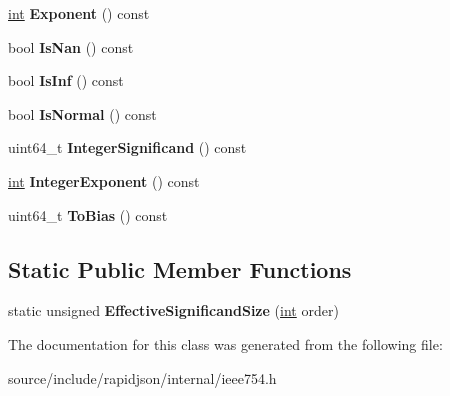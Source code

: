 \begin{DoxyCompactItemize}
\item 
\hypertarget{classinternal_1_1_double_a39aa84d5dc24cf22ca44578fab515f44}{}\hyperlink{_s_d_l__thread_8h_a6a64f9be4433e4de6e2f2f548cf3c08e}{int} {\bfseries Exponent} () const \label{classinternal_1_1_double_a39aa84d5dc24cf22ca44578fab515f44}

\item 
\hypertarget{classinternal_1_1_double_a5c1ad93b8c866afdd5c2b412ef7bea98}{}bool {\bfseries Is\+Nan} () const \label{classinternal_1_1_double_a5c1ad93b8c866afdd5c2b412ef7bea98}

\item 
\hypertarget{classinternal_1_1_double_a2efab47ffbfa75e0fca1129263b86545}{}bool {\bfseries Is\+Inf} () const \label{classinternal_1_1_double_a2efab47ffbfa75e0fca1129263b86545}

\item 
\hypertarget{classinternal_1_1_double_ac34b7871eeb80d2b6bac48f144c97b51}{}bool {\bfseries Is\+Normal} () const \label{classinternal_1_1_double_ac34b7871eeb80d2b6bac48f144c97b51}

\item 
\hypertarget{classinternal_1_1_double_a96c5e0f06551e83565b5097950d30e32}{}uint64\+\_\+t {\bfseries Integer\+Significand} () const \label{classinternal_1_1_double_a96c5e0f06551e83565b5097950d30e32}

\item 
\hypertarget{classinternal_1_1_double_a8e16ee31d521fb56f0b98be427a9d47e}{}\hyperlink{_s_d_l__thread_8h_a6a64f9be4433e4de6e2f2f548cf3c08e}{int} {\bfseries Integer\+Exponent} () const \label{classinternal_1_1_double_a8e16ee31d521fb56f0b98be427a9d47e}

\item 
\hypertarget{classinternal_1_1_double_af8b543dc813f761d274824f7cef00a43}{}uint64\+\_\+t {\bfseries To\+Bias} () const \label{classinternal_1_1_double_af8b543dc813f761d274824f7cef00a43}

\end{DoxyCompactItemize}
\subsection*{Static Public Member Functions}
\begin{DoxyCompactItemize}
\item 
\hypertarget{classinternal_1_1_double_a980c26d006068b23406805e9b0e02588}{}static unsigned {\bfseries Effective\+Significand\+Size} (\hyperlink{_s_d_l__thread_8h_a6a64f9be4433e4de6e2f2f548cf3c08e}{int} order)\label{classinternal_1_1_double_a980c26d006068b23406805e9b0e02588}

\end{DoxyCompactItemize}


The documentation for this class was generated from the following file\+:\begin{DoxyCompactItemize}
\item 
source/include/rapidjson/internal/ieee754.\+h\end{DoxyCompactItemize}

